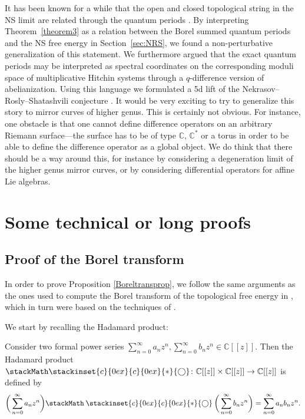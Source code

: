 \documentclass[pdftex]{sigma}
\newcommand\oast{\stackMath\mathbin{\stackinset{c}{0ex}{c}{0ex}{\ast}{\bigcirc}}}
\numberwithin{equation}{section}
\begin{document}
It has been known for a while that the open and closed topological string in the NS limit are related through the quantum periods \cite{ACDKV}. By interpreting
Theorem~\ref{theorem3} as a relation between the Borel summed quantum periods and the NS free energy in Section~\ref{sec:NRS}, we found a non-perturbative generalization of this statement. We furthermore argued that the exact quantum periods may be interpreted as spectral coordinates on the corresponding moduli space of multiplicative Hitchin systems through a $q$-difference version of abelianization. Using this language we formulated a 5d lift of the Nekrasov--Rosly--Shatashvili conjecture \cite{Nekrasov:NRS}. It would be very exciting to try to generalize this story to mirror curves of higher genus. This is certainly not obvious. For instance, one obstacle is that one cannot define difference operators on an arbitrary Riemann surface---the surface has to be of type $\mathbb{C}$, $\mathbb{C}^*$ or a torus in order to be able to define the difference operator as a global object. We do think that there should be a way around this, for instance by considering a degeneration limit of the higher genus mirror curves, or by considering differential operators for affine Lie algebras.

\appendix
\section{Some technical or long proofs}\label{appA}
\subsection{Proof of the Borel transform}\label{BTapp}

In order to prove Proposition \ref{Boreltransprop}, we follow the same arguments as the ones used to compute the Borel transform of the topological free energy in \cite{ASTT21}, which in turn were based on the techniques of \cite{garoufalidis2020resurgence}.

We start by recalling the Hadamard product:

\begin{Definition}
Consider two formal power series $\sum_{n=0}^{\infty}a_nz^n,\sum_{n=0}^{\infty}b_nz^n\in \mathbb{C}[[z]]$. Then the Hadamard product $\oast\colon\mathbb{C}[[z]]\times \mathbb{C}[[z]] \to \mathbb{C}[[z]]$ is defined by
\begin{equation*}
 \bigg(\sum_{n=0}^{\infty}a_nz^n\bigg)\oast \bigg(\sum_{n=0}^{\infty}b_nz^n\bigg)=\sum_{n=0}^{\infty}a_nb_nz^n.
\end{equation*}
\end{Definition}
\end{document}
